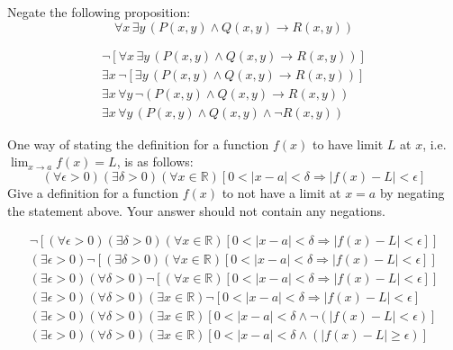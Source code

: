 \documentclass[11pt,letterpaper]{article}
\begin{document}
 Negate the following proposition:
	\[
	\forall x\, \exists y\, \left( P(x,y) \wedge Q(x,y) \to R(x,y) \right)
	\]

\sol
	\[
	\begin{aligned}
	\neg [\forall x\, \exists y\, \left( P(x,y) \wedge Q(x,y) \to R(x,y) \right)] \\[0.5cm]
	\exists x\, \neg[\exists y\, \left( P(x,y) \wedge Q(x,y) \to R(x,y) \right)] \\[0.5cm]
	\exists x\, \forall y\, \neg\left( P(x,y) \wedge Q(x,y) \to R(x,y) \right) \\[0.5cm]
	\exists x\, \forall y\, \left( P(x,y) \wedge Q(x,y) \wedge  \neg R(x,y) \right)
	\end{aligned}
	\]





\newpage





 One way of stating the definition for a function $f(x)$ to have limit $L$ at $x$, i.e. $\displaystyle \lim_{x \to a} f(x)= L$, is as follows:
	\[
	(\forall \epsilon > 0)(\exists \delta > 0)(\forall x \in \mathbb{R})[ 0 < |x - a| < \delta \Rightarrow |f(x) - L| < \epsilon]
	\]
Give a definition for a function $f(x)$ to not have a limit at $x= a$ by negating the statement above. Your answer should not contain any negations. 

\sol
	\[
	\begin{aligned}
	\neg [(\forall \epsilon > 0)(\exists \delta > 0)(\forall x \in \mathbb{R})[ 0 < |x - a| < \delta \Rightarrow |f(x) - L| < \epsilon]] \\[0.5cm]
	(\exists \epsilon > 0) \neg[(\exists \delta > 0)(\forall x \in \mathbb{R})[ 0 < |x - a| < \delta \Rightarrow |f(x) - L| < \epsilon]] \\[0.5cm]
	(\exists \epsilon > 0)(\forall \delta > 0) \neg[(\forall x \in \mathbb{R})[ 0 < |x - a| < \delta \Rightarrow |f(x) - L| < \epsilon]] \\[0.5cm]
	(\exists \epsilon > 0)(\forall \delta > 0)(\exists x \in \mathbb{R}) \neg[ 0 < |x - a| < \delta \Rightarrow |f(x) - L| < \epsilon] \\[0.5cm]
	(\exists \epsilon > 0)(\forall \delta > 0)(\exists x \in \mathbb{R}) [ 0 < |x - a| < \delta \wedge \neg (|f(x) - L| < \epsilon) ] \\[0.5cm]
	(\exists \epsilon > 0)(\forall \delta > 0)(\exists x \in \mathbb{R}) [ 0 < |x - a| < \delta \wedge  (|f(x) - L| \geq \epsilon) ]
	\end{aligned}
	\]
\end{document}
